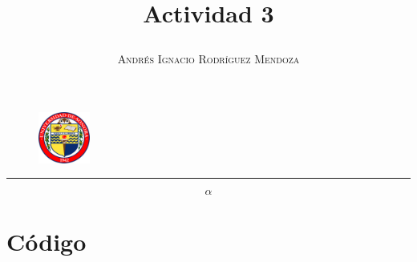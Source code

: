 \documentclass[11pt,spanish]{article}
\title{\vspace{-3cm}\begin{flushleft}\textbf{Actividad 3}\end{flushleft}}
\author{\hspace{-9.6cm}\textsc{Andrés Ignacio Rodríguez Mendoza}}
\date{}
\begin{document}
\begin{figure}
  \begin{center}
   \vspace{-5.4cm} \includegraphics[width=0.15\textwidth]{uni}
  \end{center}
\end{figure}

\maketitle  
\begin{center}
\rule{\textwidth}{1pt}
\end{center}

$$\alpha$$

\section*{Código}
\end{document}
